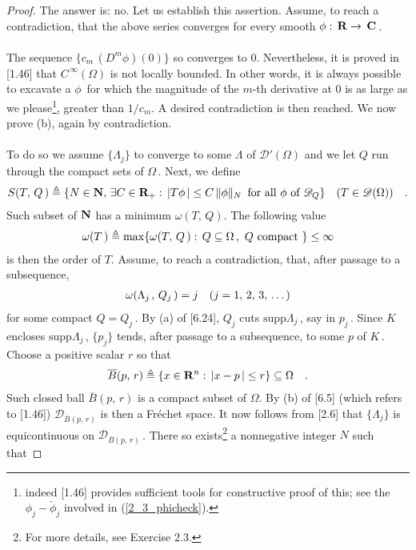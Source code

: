 \begin{proof} The answer is: no. Let us establish this assertion. Assume, to reach a contradiction, that the above series converges for every smooth $\phi:\, {\mathbf R}\to\,{\mathbf C}\,$. \\
\\
The sequence $\{c_m\, (D^m\phi)(0)\}$ so converges to $0$. Nevertheless, it is proved in [1.46] that $C^{\,\infty}(\Omega)$ is not locally bounded. In other words, it is always possible to excavate a $\phi\,$ for which the magnitude of the $m$-th derivative at $0$ is as large as we please\footnote{indeed [1.46] provides sufficient tools for constructive proof of this; see the $\phi_j-\check{\phi}_j$ involved in (\ref{2_3_phicheck}).}, \eg greater than $1/c_m$.
 A desired contradiction is then reached. We now prove (b), again by contradiction.\\
\\
To do so we assume $\{\Lambda_j\}$ to converge to some $\Lambda$ of $\mathscr{D}'(\Omega)$ and we let $Q$ run through the compact sets of $\Omega\,$. Next, we define
\begin{align}{\label{6_6_1}
S(T,\, Q\,)\triangleq\{N\in {\mathbf N}, \, \exists C\in {\mathbf R}_+:\, \lvert T\phi\, \rvert \leq C\, \| \phi \|_N \,\text{ for all }\phi \text{ of } \mathscr{D}_Q \}\quad (T\in \mathscr{D}(\Omega))\quad .
}\end{align}
Such subset of ${\mathbf N}$ has a minimum $\omega(T,\, Q)$. The following value
\begin{align}{\label{6_6_2}
\omega (T\,) \triangleq\max\{ \omega(T,\, Q\,): \, Q\subseteq \Omega\, , \,\, Q \text{ compact }\}\leq \infty
}\end{align}
is then the order of $T$. Assume, to reach a contradiction, that, after passage to a subsequence,
\begin{align}{\label{6_6_3}
\omega (\Lambda_{j\,},\, Q_j\,) =j\quad (j=1,\, 2,\, 3,\, \dots)
}\end{align}
for some compact $Q=Q_j\,$. By (a) of [6.24], $Q_j$ cuts $\text{supp}\Lambda_j\,$, say in $p_j\,$. Since $K$ encloses $\text{supp}\Lambda_j\,$, $\{p_j\}$ tends, after passage to a subsequence, to some $p$ of $K\,$.
Choose a positive scalar $r$ so that 
\begin{align}{\label{6_6_5}
\overline{B}(p,\, r)\triangleq\{ x\in {\mathbf R}^n:\, \lvert x-p\,\rvert\leq r\}\subseteq \Omega \quad .
}\end{align}
Such closed ball $\overline{B}(p,\, r)$ is a compact subset of $\Omega$. By (b) of [6.5] (which refers to [1.46])  $\mathscr{D}_{\overline{B}(p,\, r)}$ is then a Fréchet space. It now follows from [2.6] that $\{\Lambda_j\}$ is equicontinuous on $\mathscr{D}_{\overline{B}(p,\, r)}\,$. There so exists\footnote{For more details, see Exercise 2.3.} a nonnegative integer $N$ such that 

\end{proof}
